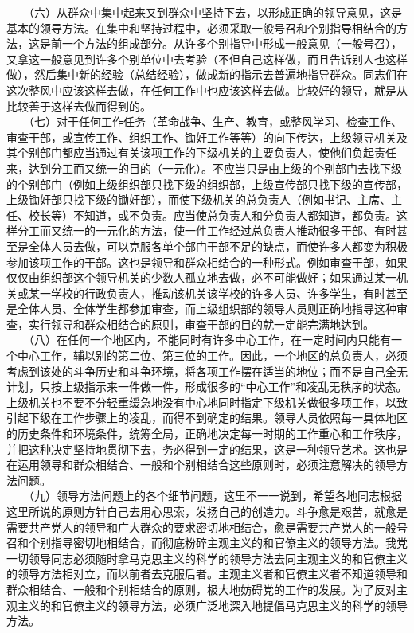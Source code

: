 \documentclass[cn,11pt,chinese]{elegantbook}
\begin{document}
　　（六）从群众中集中起来又到群众中坚持下去，以形成正确的领导意见，这是基本的领导方法。在集中和坚持过程中，必须采取一般号召和个别指导相结合的方法，这是前一个方法的组成部分。从许多个别指导中形成一般意见（一般号召），又拿这一般意见到许多个别单位中去考验（不但自己这样做，而且告诉别人也这样做），然后集中新的经验（总结经验），做成新的指示去普遍地指导群众。同志们在这次整风中应该这样去做，在任何工作中也应该这样去做。比较好的领导，就是从比较善于这样去做而得到的。\\
　　（七）对于任何工作任务（革命战争、生产、教育，或整风学习、检查工作、审查干部，或宣传工作、组织工作、锄奸工作等等）的向下传达，上级领导机关及其个别部门都应当通过有关该项工作的下级机关的主要负责人，使他们负起责任来，达到分工而又统一的目的（一元化）。不应当只是由上级的个别部门去找下级的个别部门（例如上级组织部只找下级的组织部，上级宣传部只找下级的宣传部，上级锄奸部只找下级的锄奸部），而使下级机关的总负责人（例如书记、主席、主任、校长等）不知道，或不负责。应当使总负责人和分负责人都知道，都负责。这样分工而又统一的一元化的方法，使一件工作经过总负责人推动很多干部、有时甚至是全体人员去做，可以克服各单个部门干部不足的缺点，而使许多人都变为积极参加该项工作的干部。这也是领导和群众相结合的一种形式。例如审查干部，如果仅仅由组织部这个领导机关的少数人孤立地去做，必不可能做好；如果通过某一机关或某一学校的行政负责人，推动该机关该学校的许多人员、许多学生，有时甚至是全体人员、全体学生都参加审查，而上级组织部的领导人员则正确地指导这种审查，实行领导和群众相结合的原则，审查干部的目的就一定能完满地达到。\\
　　（八）在任何一个地区内，不能同时有许多中心工作，在一定时间内只能有一个中心工作，辅以别的第二位、第三位的工作。因此，一个地区的总负责人，必须考虑到该处的斗争历史和斗争环境，将各项工作摆在适当的地位；而不是自己全无计划，只按上级指示来一件做一件，形成很多的“中心工作”和凌乱无秩序的状态。上级机关也不要不分轻重缓急地没有中心地同时指定下级机关做很多项工作，以致引起下级在工作步骤上的凌乱，而得不到确定的结果。领导人员依照每一具体地区的历史条件和环境条件，统筹全局，正确地决定每一时期的工作重心和工作秩序，并把这种决定坚持地贯彻下去，务必得到一定的结果，这是一种领导艺术。这也是在运用领导和群众相结合、一般和个别相结合这些原则时，必须注意解决的领导方法问题。\\
　　（九）领导方法问题上的各个细节问题，这里不一一说到，希望各地同志根据这里所说的原则方针自己去用心思索，发扬自己的创造力。斗争愈是艰苦，就愈是需要共产党人的领导和广大群众的要求密切地相结合，愈是需要共产党人的一般号召和个别指导密切地相结合，而彻底粉碎主观主义的和官僚主义的领导方法。我党一切领导同志必须随时拿马克思主义的科学的领导方法去同主观主义的和官僚主义的领导方法相对立，而以前者去克服后者。主观主义者和官僚主义者不知道领导和群众相结合、一般和个别相结合的原则，极大地妨碍党的工作的发展。为了反对主观主义的和官僚主义的领导方法，必须广泛地深入地提倡马克思主义的科学的领导方法。\\
\end{document}
